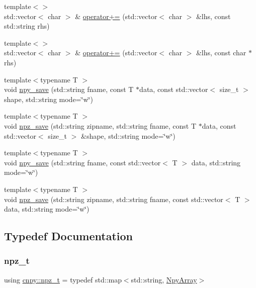 \begin{DoxyCompactItemize}
\item 
{\footnotesize template$<$$>$ }\\std\+::vector$<$ char $>$ \& \hyperlink{namespacecnpy_a357cd39fe2f4327eb08495b48544d47e}{operator+=} (std\+::vector$<$ char $>$ \&lhs, const std\+::string rhs)
\item 
{\footnotesize template$<$$>$ }\\std\+::vector$<$ char $>$ \& \hyperlink{namespacecnpy_adde4f7c4e52778f1e28effe4ae80bef3}{operator+=} (std\+::vector$<$ char $>$ \&lhs, const char $\ast$rhs)
\item 
{\footnotesize template$<$typename T $>$ }\\void \hyperlink{namespacecnpy_abd95249bf67216d36416294df339fb47}{npy\+\_\+save} (std\+::string fname, const T $\ast$data, const std\+::vector$<$ size\+\_\+t $>$ shape, std\+::string mode=\char`\"{}w\char`\"{})
\item 
{\footnotesize template$<$typename T $>$ }\\void \hyperlink{namespacecnpy_acdeed7370a9ddc23ce3b66534e039a1f}{npz\+\_\+save} (std\+::string zipname, std\+::string fname, const T $\ast$data, const std\+::vector$<$ size\+\_\+t $>$ \&shape, std\+::string mode=\char`\"{}w\char`\"{})
\item 
{\footnotesize template$<$typename T $>$ }\\void \hyperlink{namespacecnpy_a9311beeca7e441c777c78fc80be40649}{npy\+\_\+save} (std\+::string fname, const std\+::vector$<$ T $>$ data, std\+::string mode=\char`\"{}w\char`\"{})
\item 
{\footnotesize template$<$typename T $>$ }\\void \hyperlink{namespacecnpy_a7161744ba1c204fea5c5e15b177a311f}{npz\+\_\+save} (std\+::string zipname, std\+::string fname, const std\+::vector$<$ T $>$ data, std\+::string mode=\char`\"{}w\char`\"{})
\end{DoxyCompactItemize}


\subsection{Typedef Documentation}
\mbox{\label{namespacecnpy_acfea2d25a7c0e41b79f04864b0a64a2b}} 
\subsubsection{\texorpdfstring{npz\+\_\+t}{npz\_t}}
{\footnotesize\ttfamily using \hyperlink{namespacecnpy_acfea2d25a7c0e41b79f04864b0a64a2b}{cnpy\+::npz\+\_\+t} = typedef std\+::map$<$std\+::string, \hyperlink{structcnpy_1_1_npy_array}{Npy\+Array}$>$}




